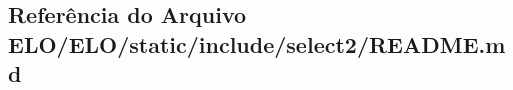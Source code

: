\hypertarget{ELO_2ELO_2static_2include_2select2_2README_8md}{\subsection{Referência do Arquivo E\-L\-O/\-E\-L\-O/static/include/select2/\-R\-E\-A\-D\-M\-E.md}
\label{ELO_2ELO_2static_2include_2select2_2README_8md}
}
